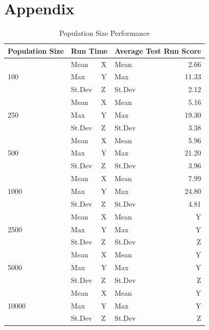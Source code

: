 \documentclass{article}
\begin{document}
\newpage
\raggedright
{}


\newpage
\section{Appendix}

\begin{table}[h]
\begin{center}
\begin{tabular}{|l|l|l|l|r|}
\hline%
\textbf{Population Size} & \multicolumn{2}{c|}{\textbf{Run Time}} & \multicolumn{2}{c|}{\textbf{Average Test Run Score}} \\
\hline
\multirow{3}{*}{100}
& Mean & X & Mean & 2.66 \\
& Max & Y & Max & 11.33 \\
& St.Dev & Z & St.Dev & 2.12 \\
\hline
\multirow{3}{*}{250}
& Mean & X & Mean & 5.16 \\
& Max & Y & Max & 19.30 \\
& St.Dev & Z & St.Dev & 3.38 \\
\hline
\multirow{3}{*}{500}
& Mean & X & Mean & 5.96 \\
& Max & Y & Max & 21.20 \\
& St.Dev & Z & St.Dev & 3.96 \\
\hline
\multirow{3}{*}{1000}
& Mean & X & Mean & 7.99 \\
& Max & Y & Max & 24.80 \\
& St.Dev & Z & St.Dev & 4.81 \\
\hline
\multirow{3}{*}{2500}
& Mean & X & Mean & Y \\
& Max & Y & Max & Y \\
& St.Dev & Z & St.Dev & Z \\
\hline
\multirow{3}{*}{5000}
& Mean & X & Mean & Y \\
& Max & Y & Max & Y \\
& St.Dev & Z & St.Dev & Z \\
\hline
\multirow{3}{*}{10000}
& Mean & X & Mean & Y \\
& Max & Y & Max & Y \\
& St.Dev & Z & St.Dev & Z \\
\hline
\end{tabular}
\end{center}
\caption{Population Size Performance}
\label{table:population_size}
\end{table}
\end{document}
